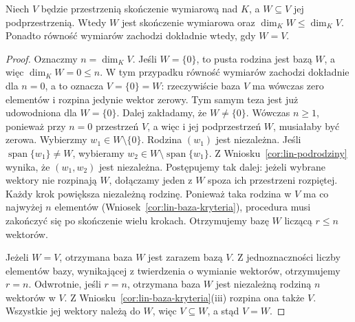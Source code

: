 \begin{twierdzenie}
\label{thm:lin-wymiar-podprzestrzeni}
Niech \(V\) będzie przestrzenią skończenie wymiarową
nad \(K\), a \(W\subseteq V\) jej podprzestrzenią.
Wtedy \(W\) jest skończenie wymiarowa oraz
\(\dim_KW\leq\dim_KV\).
Ponadto równość wymiarów zachodzi dokładnie wtedy,
gdy \(W=V\).
\end{twierdzenie}
\begin{proof}
Oznaczmy \(n=\dim_KV\). Jeśli \(W=\{0\}\),
to pusta rodzina jest bazą \(W\), a więc
\(\dim_KW=0\leq n\).
W tym przypadku równość wymiarów zachodzi
dokładnie dla \(n=0\), a to oznacza \(V=\{0\}=W\):
rzeczywiście baza \(V\) ma wówczas
zero elementów i rozpina jedynie wektor zerowy.
Tym samym teza jest już udowodniona dla \(W=\{0\}\).
Dalej zakładamy, że \(W\neq\{0\}\).
Wówczas \(n\geq1\), ponieważ przy \(n=0\)
przestrzeń \(V\), a więc i jej podprzestrzeń \(W\),
musiałaby być zerowa.
Wybierzmy \(w_1\in W\setminus\{0\}\).
Rodzina \((w_1)\) jest niezależna.
Jeśli \(\operatorname{span}\{w_1\}\neq W\),
wybieramy \(w_2\in W\setminus\operatorname{span}\{w_1\}\).
Z Wniosku~\ref{cor:lin-podrodziny} wynika,
że \((w_1,w_2)\) jest niezależna.
Postępujemy tak dalej: jeżeli wybrane wektory
nie rozpinają \(W\), dołączamy jeden z \(W\)
spoza ich przestrzeni rozpiętej.
Każdy krok powiększa niezależną rodzinę.
Ponieważ taka rodzina w \(V\) ma co najwyżej
\(n\) elementów (Wniosek~\ref{cor:lin-baza-kryteria}),
procedura musi zakończyć się po skończenie wielu krokach.
Otrzymujemy bazę \(W\) liczącą \(r\leq n\) wektorów.

Jeżeli \(W=V\), otrzymana baza \(W\) jest zarazem bazą \(V\). Z jednoznaczności liczby elementów bazy, wynikającej z twierdzenia o wymianie wektorów, otrzymujemy \(r=n\).
Odwrotnie, jeśli \(r=n\), otrzymana baza
\(W\) jest niezależną rodziną \(n\) wektorów w \(V\).
Z Wniosku~\ref{cor:lin-baza-kryteria}(iii)
rozpina ona także \(V\). Wszystkie jej
wektory należą do \(W\), więc \(V\subseteq W\),
a stąd \(V=W\).
\end{proof}

